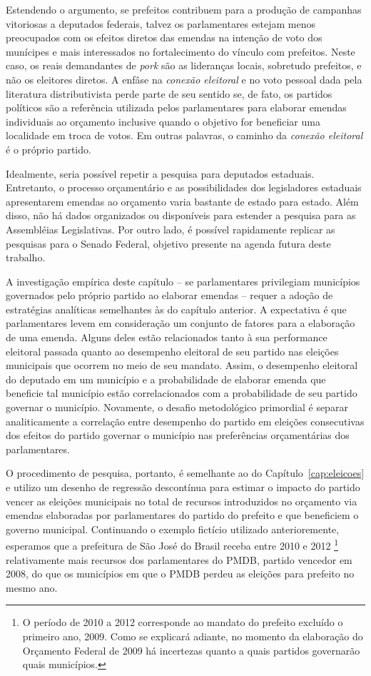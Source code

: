 Estendendo o argumento, se prefeitos contribuem para a produção de campanhas vitoriosas a deputados federais, talvez os parlamentares estejam menos preocupados com os efeitos diretos das emendas na intenção de voto dos munícipes e mais interessados no fortalecimento do vínculo com prefeitos. Neste caso, os reais demandantes de \emph{pork} são as lideranças locais, sobretudo prefeitos, e não os eleitores diretos. A enfâse na \emph{conexão eleitoral} e no voto pessoal dada pela literatura distributivista perde parte de seu sentido se, de fato, os partidos políticos são a referência utilizada pelos parlamentares para elaborar emendas individuais ao orçamento inclusive quando o objetivo for beneficiar uma localidade em troca de votos. Em outras palavras, o caminho da \emph{conexão eleitoral} é o próprio partido.

Idealmente, seria possível repetir a pesquisa para deputados estaduais. Entretanto, o processo orçamentário e as possibilidades dos legisladores estaduais apresentarem emendas ao orçamento varia bastante de estado para estado. Além disso, não há dados organizados ou disponíveis para estender a pesquisa para as Assembléias Legislativas. Por outro lado, é possível rapidamente replicar as pesquisas para o Senado Federal, objetivo presente na agenda futura deste trabalho.

A investigação empírica deste capítulo -- se parlamentares privilegiam municípios governados pelo próprio partido ao elaborar emendas -- requer a adoção de estratégias analíticas semelhantes às do capítulo anterior. A expectativa é que parlamentares levem em consideração um conjunto de fatores para a elaboração de uma emenda. Alguns deles estão relacionados tanto à sua performance eleitoral passada quanto ao desempenho eleitoral de seu partido nas eleições municipais que ocorrem no meio de seu mandato. Assim, o desempenho eleitoral do deputado em um município e a probabilidade de elaborar emenda que beneficie tal município estão correlacionados com a probabilidade de seu partido governar o município. Novamente, o desafio metodológico primordial é separar analiticamente a correlação entre desempenho do partido em eleições consecutivas dos efeitos do partido governar o município nas preferências orçamentárias dos parlamentares.

O procedimento de pesquisa, portanto, é semelhante ao do Capítulo~\ref{cap:eleicoes} e utilizo um desenho de regressão descontínua para estimar o impacto do partido vencer as eleições municipais no total de recursos introduzidos no orçamento via emendas elaboradas por parlamentares do partido do prefeito e que beneficiem o governo municipal. Continuando o exemplo fictício utilizado anterioremente, esperamos que a prefeitura de São José do Brasil receba entre 2010 e 2012 \footnote{O período de 2010 a 2012 corresponde ao mandato do prefeito excluído o primeiro ano, 2009. Como se explicará adiante, no momento da elaboração do Orçamento Federal de 2009 há incertezas quanto a quais partidos governarão quais municípios.} relativamente mais recursos dos parlamentares do PMDB, partido vencedor em 2008, do que os municípios em que o PMDB perdeu as eleições para prefeito no mesmo ano.

